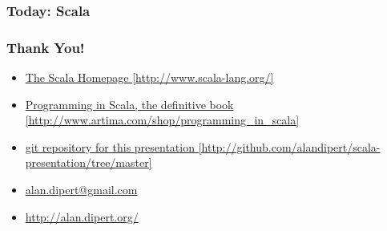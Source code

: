 \begin{frame} 
\frametitle{Today: Scala}
\tt\tiny{

}
\end{frame} 

\begin{frame} 
\frametitle{Thank You!}
\begin{itemize}
  \item<1-> \href{http://www.scala-lang.org/}{The Scala Homepage [http://www.scala-lang.org/]}
  \item<1-> \href{http://www.artima.com/shop/programming\_in\_scala}{Programming in Scala, the definitive book [http://www.artima.com/shop/programming\_in\_scala]}
  \item<1-> \href{http://github.com/alandipert/scala-presentation/tree/master}{git repository for this presentation [http://github.com/alandipert/scala-presentation/tree/master]}
\end{itemize}
\begin{itemize}
  \item<1-> \href{mailto:alan.dipert@gmail.com}{alan.dipert@gmail.com}
  \item<1-> \href{http://alan.dipert.org/}{http://alan.dipert.org/}
\end{itemize}
\end{frame} 

 
